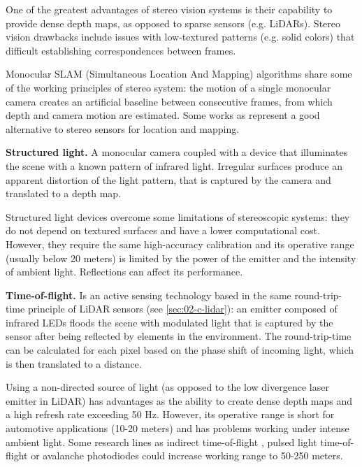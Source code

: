 \documentclass[journal]{IEEEtran}
\begin{document}
One of the greatest advantages of stereo vision systems is their capability 
to provide dense depth maps, as opposed to sparse sensors (e.g. LiDARs).  
Stereo vision drawbacks include issues with low-textured patterns 
(e.g. solid colors) that difficult establishing correspondences between
frames.

Monocular SLAM (Simultaneous Location And Mapping) algorithms share some of the
working principles of stereo system: the motion of a single monocular camera 
creates an artificial baseline between consecutive frames, from which depth and
camera motion are estimated.
Some works as \cite{Engel2014, Engel2018} represent a good alternative to
stereo sensors for location and mapping. 

\textbf{Structured light.} A monocular camera coupled with a device that
illuminates the scene with a known pattern of infrared light. 
Irregular surfaces produce an apparent distortion of the light pattern, that is
captured by the camera and translated to a depth map.

Structured light devices overcome some limitations of stereoscopic systems:
they do not depend on textured surfaces and have a lower computational cost. 
However, they require the same high-accuracy calibration \cite{Garbat2013}
and its operative range (usually below 20 meters) is limited by the power of
the emitter and the intensity of ambient light. Reflections can affect its
performance.

\textbf{Time-of-flight.} Is an active sensing technology 
\cite{Hansard2013} based in the same round-trip-time principle 
of LiDAR sensors (see \ref{sec:02-c-lidar}): an emitter composed of infrared 
LEDs floods the scene with modulated light that is captured by the sensor after
being reflected by elements in the environment. 
The round-trip-time can be calculated for each pixel based on the phase shift 
of incoming light, which is then translated to a distance.

Using a non-directed source of light (as opposed to the low divergence laser
emitter in LiDAR) has advantages as the ability to create dense depth maps and
a high refresh rate exceeding 50 Hz. However, its operative range is short for
automotive applications (10-20 meters) and has problems working under intense
ambient light. 
Some research lines as indirect time-of-flight \cite{Villa2017}, pulsed light
time-of-flight or avalanche photodiodes \cite{Panasonic2018} could increase
working range to 50-250 meters.

\end{document}
